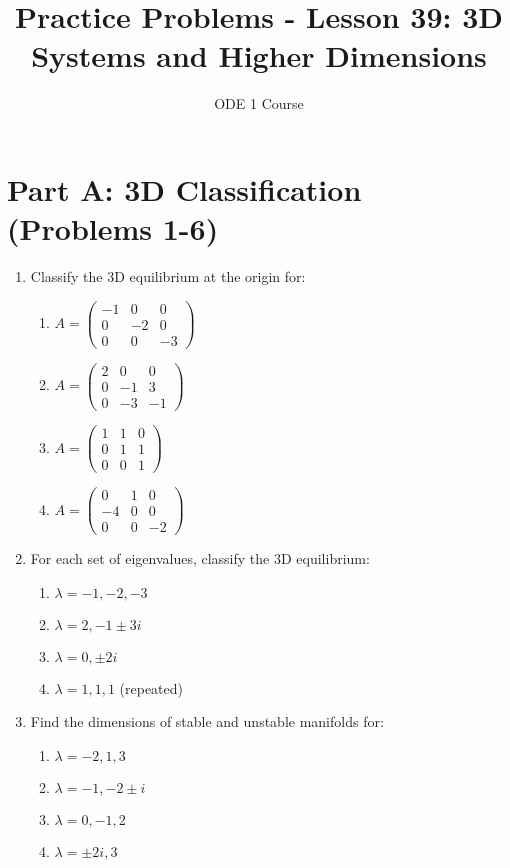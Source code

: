 \documentclass[12pt]{article}
\title{Practice Problems - Lesson 39: 3D Systems and Higher Dimensions}
\author{ODE 1 Course}
\date{}
\begin{document}
\maketitle

\section*{Part A: 3D Classification (Problems 1-6)}

\begin{enumerate}
\item Classify the 3D equilibrium at the origin for:
\begin{enumerate}[label=(\alph*)]
    \item $A = \begin{pmatrix} -1 & 0 & 0 \\ 0 & -2 & 0 \\ 0 & 0 & -3 \end{pmatrix}$
    \item $A = \begin{pmatrix} 2 & 0 & 0 \\ 0 & -1 & 3 \\ 0 & -3 & -1 \end{pmatrix}$
    \item $A = \begin{pmatrix} 1 & 1 & 0 \\ 0 & 1 & 1 \\ 0 & 0 & 1 \end{pmatrix}$
    \item $A = \begin{pmatrix} 0 & 1 & 0 \\ -4 & 0 & 0 \\ 0 & 0 & -2 \end{pmatrix}$
\end{enumerate}

\item For each set of eigenvalues, classify the 3D equilibrium:
\begin{enumerate}[label=(\alph*)]
    \item $\lambda = -1, -2, -3$
    \item $\lambda = 2, -1 \pm 3i$
    \item $\lambda = 0, \pm 2i$
    \item $\lambda = 1, 1, 1$ (repeated)
\end{enumerate}

\item Find the dimensions of stable and unstable manifolds for:
\begin{enumerate}[label=(\alph*)]
    \item $\lambda = -2, 1, 3$
    \item $\lambda = -1, -2 \pm i$
    \item $\lambda = 0, -1, 2$
    \item $\lambda = \pm 2i, 3$
\end{enumerate}


\end{enumerate}
\end{document}
